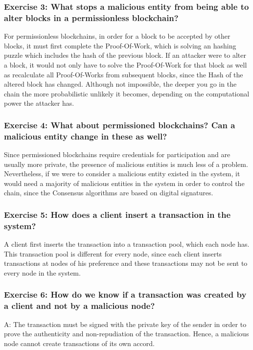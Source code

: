 \documentclass[12pt,a4paper]{article}
\begin{document}
\subsubsection*{Exercise 3: What stops a malicious entity from being able to alter blocks in a permissionless blockchain?}

For permissionless blockchains, in order for a block to be accepted by other blocks, it must first complete the Proof-Of-Work, which is solving an hashing puzzle which includes the hash of the previous block. If an attacker were to alter a block, it would not only have to solve the Proof-Of-Work for that block as well as recalculate all Proof-Of-Works from subsequent blocks, since the Hash of the altered block has changed. Although not impossible, the deeper you go in the chain the more probabilistic unlikely it becomes, depending on the computational power the attacker has.


\subsubsection*{Exercise 4: What about permissioned blockchains? Can a malicious entity change in these as well?}

Since permissioned blockchains require credentials for participation and are usually more private, the presence of malicious entities is much less of a problem. Nevertheless, if we were to consider a malicious entity existed in the system, it would need a majority of malicious entities in the system in order to control the chain, since the Consensus algorithms are based on digital signatures. 


\subsubsection*{Exercise 5: How does a client insert a transaction in the system?
}

A client first inserts the transaction into a transaction pool, which each node has. This transaction pool is different for every node, since each client inserts transactions at nodes of his preference and these transactions may not be sent to every node in the system.

\subsubsection*{Exercise 6: How do we know if a transaction was created by a client and not by a malicious node?}
A: The transaction must be signed with the private key of the sender in order to prove the authenticity and non-repudiation of the transaction. Hence, a malicious node cannot create transactions of its own accord.
\end{document}

